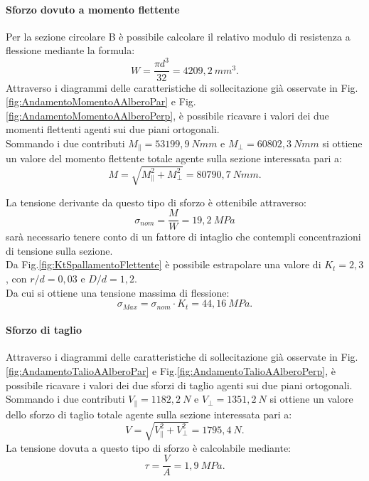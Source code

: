 \paragraph{Sforzo dovuto a momento flettente} Per la sezione circolare B è possibile calcolare il relativo modulo di resistenza a flessione mediante la formula:
\begin{equation}
    W=\frac{\pi d^3}{32}=4209,2\ mm^3.
    \label{W_B}
\end{equation}
Attraverso i diagrammi delle caratteristiche di sollecitazione già osservate in Fig.\ref{fig:AndamentoMomentoAAlberoPar} e Fig.\ref{fig:AndamentoMomentoAAlberoPerp}, è possibile ricavare i valori dei due momenti flettenti agenti sui due piani ortogonali.\\ 
Sommando i due contributi $M_{\parallel}=53199,9\ Nmm$ e $M_{\perp}=60802,3\ Nmm$ si ottiene un valore del momento flettente totale agente sulla sezione interessata pari a:
\begin{equation}
    M=\sqrt{M_{\parallel}^2+M_{\perp}^2}=80790,7\ Nmm.
\end{equation}

La tensione derivante da questo tipo di sforzo è ottenibile attraverso:
\begin{equation}
    \sigma_{nom}=\frac{M}{W}=19,2\ MPa
\end{equation}
sarà necessario tenere conto di un fattore di intaglio che contempli concentrazioni di tensione sulla sezione. \\
Da Fig.\ref{fig:KtSpallamentoFlettente} è possibile estrapolare una valore di $K_t=2,3$, con $r/d=0,03$ e $D/d=1,2$. \\
Da cui si ottiene una tensione massima di flessione:
 \begin{equation}
     \sigma_{Max}=\sigma_{nom}\cdot K_t= 44,16\ MPa.
 \end{equation}
 \paragraph{Sforzo di taglio}
 Attraverso i diagrammi delle caratteristiche di sollecitazione già osservate in Fig.\ref{fig:AndamentoTalioAAlberoPar} e Fig.\ref{fig:AndamentoTalioAAlberoPerp}, è possibile ricavare i valori dei due sforzi di taglio agenti sui due piani ortogonali.\\ 
Sommando i due contributi $V_{\parallel}=1182,2\ N$ e $V_{\perp}=1351,2\ N$ si ottiene un valore dello sforzo di taglio totale agente sulla sezione interessata pari a:
\begin{equation}
    V=\sqrt{V_{\parallel}^2+V_{\perp}^2}=1795,4\ N.
\end{equation}
La tensione dovuta a questo tipo di sforzo è calcolabile mediante:
\begin{equation}
    \tau=\frac{V}{A}=1,9\ MPa.
\end{equation}

